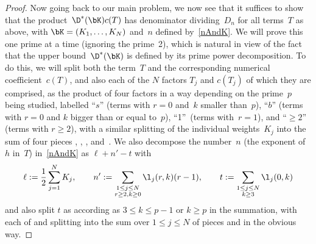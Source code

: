 \begin{proof}
Now going back to our main problem, we now see that it suffices to show that the
product~$\D^*(\bK) c(T)$ has denominator dividing~$D_n$ for all terms~$T$ as above,
with $\bK=(K_1,\dots,K_N)$ and~$n$ defined by~\eqref{nAndK}. We will prove this
one prime at a time (ignoring the prime~2), which is natural in view of the fact
that the upper bound~$\D^*(\bK)$ is defined by its prime power decomposition. To do
this, we will split both the term~$T$ and the corresponding numerical
coefficient~$c(T)$, and also each of the $N$ factors $T_j$ and $c(T_j)$ of which
they are comprised, as the product of four factors in a way depending on the
prime~$p$ being studied, labelled ``$s$'' (terms with $r=0$ and~$k$ smaller than~$p$),
``$b$'' (terms with $r=0$ and $k$ bigger than or equal to~$p$),
``1''~(terms with~${r=1}$), and ``$\ge2$'' (terms with $r\ge2$), with a similar splitting
of the individual weights~$K_j$ into the sum of four pieces
, , , and~.
We also decompose the number~$n$ (the exponent of~$h$ in~$T$) in~\eqref{nAndK} as
$\ell+n'-t$ with
\[
\ell := \frac12 \sum_{j=1}^NK_j , \qquad
n' :=\sum_{\substack{1\le j\le N \\ r\ge2, k\ge0\substack}}\l_j(r,k) (r-1) , \qquad
t :=\sum_{\substack{1\le j\le N \\k\ge3\substack}}\l_j(0,k)
\]
and also split $t$ as  according as $3\le k\le p-1$ or $k\ge p$ in
the summation, with each of  and  splitting into the sum over
$1\le j\le N$ of pieces  and  in the obvious way.


\end{proof}
